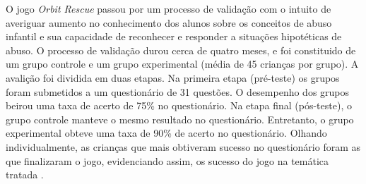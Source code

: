 






O jogo \textit{Orbit Rescue} passou por um processo de validação com o intuito de averiguar aumento no conhecimento dos alunos sobre os conceitos de abuso infantil e sua capacidade de reconhecer e responder a situações hipotéticas de abuso. %
O processo de validação durou cerca de quatro meses, e foi constituido de um grupo controle e um grupo experimental (média de 45 crianças por grupo). A avalição foi dividida em duas etapas. Na primeira etapa (pré-teste) os grupos foram submetidos a um questionário de 31 questões. O desempenho dos grupos beirou uma taxa de acerto de 75\% no questionário. Na etapa final (pós-teste), o grupo controle manteve o mesmo resultado no questionário. Entretanto, o grupo experimental obteve uma taxa de 90\% de acerto no questionário. Olhando individualmente, as crianças que mais obtiveram sucesso no questionário foram as que finalizaram o jogo, evidenciando assim, os sucesso do jogo na temática tratada \cite{jones2020serious}.



